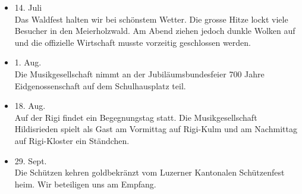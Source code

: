 \begin{history}
\begin{itemize}
        \item 14. Juli\\
              Das Waldfest halten wir bei schönstem Wetter. Die grosse Hitze lockt
              viele Besucher in den Meierholzwald. Am Abend ziehen jedoch dunkle
              Wolken auf und die offizielle Wirtschaft musste vorzeitig geschlossen
              werden.

        \item 1. Aug.\\
              Die Musikgesellschaft nimmt an der Jubiläumsbundesfeier 700 Jahre
              Eidgenossenschaft auf dem Schulhausplatz teil.

        \item 18. Aug.\\
              Auf der Rigi findet ein Begegnungstag statt. Die Musikgesellschaft
              Hildisrieden spielt als Gast am Vormittag auf Rigi-Kulm und am
              Nachmittag auf Rigi-Kloster ein Ständchen.

        \item 29. Sept.\\
              Die Schützen kehren goldbekränzt vom Luzerner Kantonalen Schützenfest
              heim. Wir beteiligen uns am Empfang.

    \end{itemize}

\end{history}
